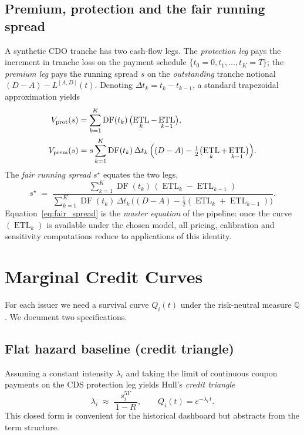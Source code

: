 \documentclass[11pt,a4paper]{article}
\newcommand{\QQ}{\mathbb{Q}}
\newcommand{\1}{\mathbf{1}}
\DeclareMathOperator{\ETL}{ETL}
\DeclareMathOperator{\DF}{DF}
\begin{document}
\subsection{Premium, protection and the fair running spread}
A synthetic CDO tranche has two cash-flow legs. The \emph{protection
leg} pays the increment in tranche loss on the payment schedule
\(\{t_{0}=0,t_{1},\dots,t_{K}=T\}\); the \emph{premium leg} pays the
running spread \(s\) on the \emph{outstanding} tranche notional
\((D-A)-L^{[A,D]}(t)\). Denoting
\(\Delta t_{k}=t_{k}-t_{k-1}\), a standard trapezoidal approximation
yields \citep{mounfield2009}
\begin{align}
V_{\text{prot}}(s)
 &= \sum_{k=1}^{K} \DF(t_{k})\,\bigl(\ETL_{k}-\ETL_{k-1}\bigr),
 \label{eq:prot_leg}\\[2pt]
V_{\text{prem}}(s)
 &= s\sum_{k=1}^{K} \DF(t_{k})\,\Delta t_{k}\,
    \Bigl((D-A) - \tfrac{1}{2}\bigl(\ETL_{k}+\ETL_{k-1}\bigr)\Bigr).
 \label{eq:prem_leg}
\end{align}
The \emph{fair running spread} \(s^{\star}\) equates the two legs,
\begin{equation}
s^{\star} \;=\;
 \frac{\displaystyle\sum_{k=1}^{K}\DF(t_{k})\,(\ETL_{k}-\ETL_{k-1})}
      {\displaystyle\sum_{k=1}^{K}\DF(t_{k})\,\Delta t_{k}\,
      \bigl((D-A)-\tfrac{1}{2}(\ETL_{k}+\ETL_{k-1})\bigr)}.
\label{eq:fair_spread}
\end{equation}
Equation~\eqref{eq:fair_spread} is the \emph{master equation} of the
pipeline: once the curve \((\ETL_{k})\) is available under the chosen
model, all pricing, calibration and sensitivity computations reduce to
applications of this identity.

\section{Marginal Credit Curves}\label{sec:curves}

For each issuer we need a survival curve \(Q_{i}(t)\) under the
risk-neutral measure \(\QQ\).  We document two specifications.

\subsection{Flat hazard baseline (credit triangle)}
Assuming a constant intensity \(\lambda_{i}\) and taking the limit of
continuous coupon payments on the CDS protection leg yields Hull's
\emph{credit triangle}
\begin{equation}
\lambda_{i} \;\approx\; \frac{s_{i}^{5Y}}{\,1-R\,},
\qquad Q_{i}(t)=e^{-\lambda_{i}\,t}.
\label{eq:flat_hazard}
\end{equation}
This closed form is convenient for the historical dashboard but
abstracts from the term structure.
\end{document}
